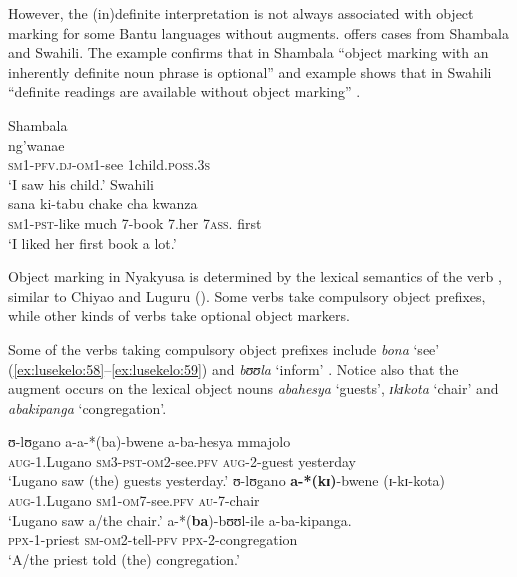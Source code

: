 \documentclass[output=paper]{langscibook}
\begin{document}
However, the (in)definite interpretation is not always associated with object marking for some Bantu languages without augments. \citet{Riedel2009} offers cases from Shambala and Swahili. The example  confirms that in Shambala “object marking with an inherently definite noun phrase is optional” and example  shows that in Swahili “definite readings are available without object marking” \citep[49]{Riedel2009}.  

\ea%
   Shambala \citep[49]{Riedel2009} \label{ex:lusekelo:56}\\
    {ng’wanae}\\   
  \textsc{sm}1-\textsc{pfv}.\textsc{dj}-\textsc{om}1-see    1child.\textsc{poss}.3\textsc{s}\\ 
\glt ‘I saw his child.’
\ex%
   Swahili \citep[49]{Riedel2009}  \label{ex:lusekelo:57}\\
  {sana}  {ki-tabu}    {chake}  {cha}   {kwanza}\\
\textsc{sm}1-\textsc{pst}-like  much   7-book    7.her  7\textsc{ass}. first\\ 
\glt ‘I liked her first book a lot.’
\z

Object marking in Nyakyusa is determined by the lexical semantics of the verb \citep{Lusekelo2012}, similar to Chiyao and Luguru (\citealt{MartenRamadhani2001, Taji2020verb}). Some verbs take compulsory object prefixes, while other kinds of verbs take optional object markers. 

Some of the verbs taking compulsory object prefixes include \textit{bona} ‘see’ (\ref{ex:lusekelo:58}--\ref{ex:lusekelo:59}) and \textit{bʊʊla} ‘inform’ . Notice also that the augment occurs on the lexical object nouns \textit{abahesya} ‘guests’, \textit{ɪkɪkota} ‘chair’ and \textit{abakipanga} ‘congregation'. 

\ea%
    \label{ex:lusekelo:58}
\gll  ʊ{}-lʊgano   a-a-*(ba)-bwene    a-ba-hesya  mmajolo\\
  \textsc{aug}-1.Lugano   \textsc{sm}3-\textsc{pst}-\textsc{om}2-see.\textsc{pfv}  \textsc{aug}-2-guest  yesterday \\
\glt  ‘Lugano saw (the) guests yesterday.’ 
\ex%
    \label{ex:lusekelo:59}
\gll  ʊ{}-lʊgano  \textbf{a-*(kɪ)}-bwene  (ɪ{}-kɪ{}-kota)\\
  \textsc{aug}-1.Lugano  {\textsc{sm}1}{}-{\textsc{om}7}{}-see.\textsc{pfv}   \textsc{au}-7-chair\\
\glt ‘Lugano saw a/the chair.’ 
\ex%
    \label{ex:lusekelo:60}
  {a-*(\textbf{ba})}{-bʊʊl-ile}  {a-ba-kipanga}.\\
  \textsc{ppx}{}-1-priest  \textsc{sm}{}-{\textsc{om2}}{}-tell-\textsc{pfv}  \textsc{ppx}{}-2-congregation\\
\glt  ‘A/the priest told (the) congregation.’
\z
\end{document}
